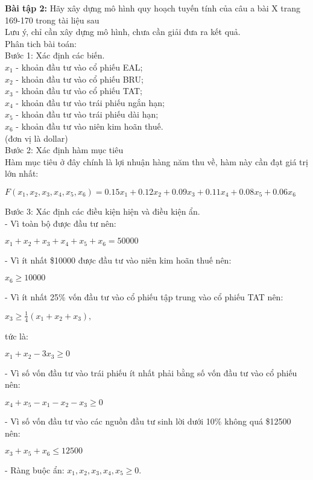 
\textbf{Bài tập 2:} Hãy xây dựng mô hình quy hoạch tuyến tính của câu a bài X trang 169-170 trong tài liệu sau 
\\
Lưu ý, chỉ cần xây dựng mô hình, chưa cần giải đưa ra kết quả.
\\
Phân tich bài toán:
\\
Bước 1: Xác định các biến.
\\
$x_1$ - khoản đầu tư vào cổ phiếu EAL;
\\
$x_2$ - khoản đầu tư vào cổ phiếu BRU;
\\
$x_3$ - khoản đầu tư vào cổ phiếu TAT;
\\
$x_4$ - khoản đầu tư vào trái phiếu ngắn hạn;
\\
$x_5$ - khoản đầu tư vào trái phiếu dài hạn;
\\
$x_6$ - khoản đầu tư vào niên kim hoãn thuế.
\\
(đơn vị là dollar)
\\
Bước 2: Xác định hàm mục tiêu
\\
Hàm mục tiêu ở đây chính là lợi nhuận hàng năm thu về, hàm này cần đạt giá trị lớn nhất:
\begin{center}
    $F(x_1, x_2, x_3, x_4, x_5, x_6) = 0.15 x_1 + 0.12 x_2 + 0.09 x_3 + 0.11 x_4 + 0.08 x_5 + 0.06 x_6$
\end{center}
Bước 3: Xác định các điều kiện hiện và điều kiện ẩn.
\\
- Vì toàn bộ  được đầu tư nên:
\begin{center}
    $x_1 + x_2 + x_3 + x_4 + x_5 + x_6 = 50000$
\end{center}
- Vì ít nhất \$10000 được đầu tư vào niên kim hoãn thuế nên:
\begin{center}
    $x_6 \geq 10000$
\end{center}
- Vì ít nhất 25\% vốn đầu tư vào cổ phiếu tập trung vào cổ phiếu TAT nên:
\begin{center}
    $x_3 \geq \frac{1}{4} (x_1 + x_2 + x_3),$
\end{center}
tức là:
\begin{center}
    $x_1 + x_2 - 3 x_3 \geq 0$
\end{center}
- Vì số vốn đầu tư vào trái phiếu ít nhất phải bằng số vốn đầu tư vào cổ phiếu nên:
\begin{center}
    $x_4 + x_5 - x_1 - x_2 - x_3 \geq 0$
\end{center}
- Vì số vốn đầu tư vào các nguồn đầu tư sinh lời dưới 10\% không quá \$12500 nên:
\begin{center}
    $x_3 + x_5 + x_6 \leq 12500$
\end{center}
- Ràng buộc ẩn: $x_1, x_2, x_3, x_4, x_5 \geq 0.$
\\

